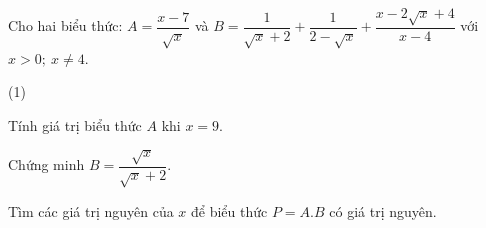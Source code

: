 
\begin{bt}
Cho hai biểu thức: $A=\dfrac{x-7}{\sqrt{x}}$ và $B=\dfrac{1}{\sqrt{x}+2}+\dfrac{1}{2-\sqrt{x}}+\dfrac{x-2\sqrt{x}+4}{x-4}$ với $x>0;\ x\ne4$.
\begin{cacy}(1)
\item Tính giá trị biểu thức $A$ khi $x=9$.
\item Chứng minh $B=\dfrac{\sqrt{x}}{\sqrt{x}+2}$.
\item Tìm các giá trị nguyên của $x$ để biểu thức $P=A.B$ có giá trị nguyên.
\end{cacy}
\end{bt}
